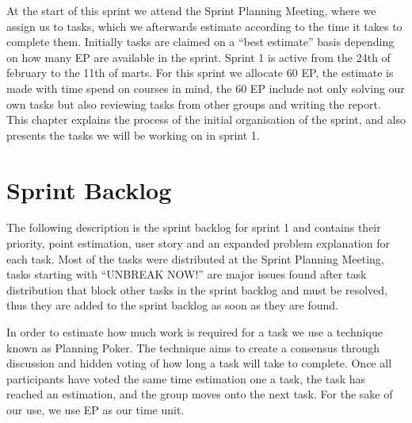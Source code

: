 At the start of this sprint we attend the Sprint Planning Meeting, where we assign us to tasks, which we afterwards estimate according to the time it takes to complete them.
Initially tasks are claimed on a ``best estimate'' basis depending on how many EP are available in the sprint.
Sprint 1 is active from the 24th of february to the 11th of marts. 
For this sprint we allocate 60 EP, the estimate is made with time spend on courses in mind, the 60 EP include not only solving our own tasks but also reviewing tasks from other groups and writing the report.
This chapter explains the process of the initial organisation of the sprint, and also presents the tasks we will be working on in sprint 1.

\section{Sprint Backlog}
The following description is the sprint backlog for sprint 1 and contains their priority, point estimation, user story and an expanded problem explanation for each task.
Most of the tasks were distributed at the Sprint Planning Meeting, tasks starting with ``UNBREAK NOW!'' are major issues found after task distribution that block other tasks in the sprint backlog and must be resolved, thus they are added to the sprint backlog as soon as they are found.

In order to estimate how much work is required for a task we use a technique known as Planning Poker.
The technique aims to create a consensus through discussion and hidden voting of how long a task will take to complete.
Once all participants have voted the same time estimation one a task, the task has reached an estimation, and the group moves onto the next task.
For the sake of our use, we use EP as our time unit.

